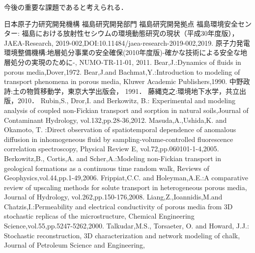 \documentclass{jsce}
\begin{document}
今後の重要な課題であると考えられる．
\vspace{0mm}
\begin{thebibliography}{99}
\begin{spacing}{1.175}
	日本原子力研究開発機構 福島研究開発部門 福島研究開発拠点 福島環境安全センター:  
	福島における放射性セシウムの環境動態研究の現状（平成30年度版），JAEA-Research,
	2019-002,DOI:10.11484/jaea-research-2019-002,2019.
	原子力発電環境整備機構:地層処分事業の安全確保(2010年度版)-確かな技術による安全な地層処分の実現のために-, NUMO-TR-11-01, 2011.
	Bear,J.:Dynamics of fluids in porous media,Dover,1972.
	Bear,J.and Bachmat,Y.:Introduction to modeling of transport phenomena in porous media, Kluwer Academic Publishers,1990.
	中野政詩:土の物質移動学，東京大学出版会， 1991．
	藤縄克之:環境地下水学，共立出版，2010．
	Rubin,S., Dror,I. and Berkowitz, B.: Experimental and 
		modeling analysis of coupled non-Fickian transport and 
		sorption in natural soils,Journal of Contaminant Hydrology, vol.132,pp.28-36,2012.
\newpage
{}
	Masuda,A.,Ushida,K. and Okamoto, T. :Direct observation of spatiotemporal dependence of anomalous diffusion in 
		inhomogeneous 
		fluid by sampling-volume-controlled fluorescence correlation spectroscopy, Physical Review E, vol.72,pp.060101-1-4,2005.
	Berkowitz,B., Cortis,A. and Scher,A.:Modeling non-Fickian transport in geological formations as a continuous time random walk, Reviews of Geophysics,vol.44,pp.1-49,2006.
	Frippiat,C.C. and Holeyman,A.E.:A comparative review of upscaling methods for solute transport in heterogeneous porous media, Journal of Hydrology, vol.262,pp.150-176,2008.
	Liang,Z.,Ioannidis,M.and Chatzis,I.:Permeability and electrical conductivity of porous media from 3D stochastic replicas of the microstructure, Chemical Engineering Science,vol.55,pp.5247-5262,2000. 
	Talkudar,M.S., Torsaeter, O. and Howard, J.J.:
	Stochastic reconstruction, 3D characterization and network modeling of chalk, Journal of Petroleum Science and Engineering, 

\end{spacing}
\end{thebibliography}
\end{document}
